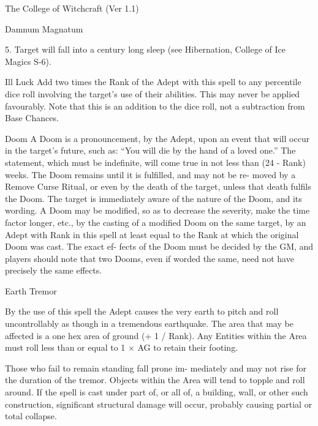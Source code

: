 \begin{Chapter}{The College of Witchcraft (Ver 1.1)}
\begin{spell}[S-10]{Damnum Magnatum }
\begin{effects}
5.  Target  will  fall  into  a  century  long  sleep  (see 
Hibernation, College of Ice Magics S-6). 

Ill Luck Add two times the Rank of the Adept with 
this  spell  to  any  percentile  dice  roll  involving  the 
target’s  use  of  their  abilities.  This  may  never  be 
applied favourably. Note that this is an addition to 
the dice roll, not a subtraction from Base Chances. 

Doom A Doom is a pronouncement, by the Adept, 
upon an event that will occur in the target’s future, 
such as: “You will die by the hand of a loved one.” 
The statement, which must be indefinite, will come 
true in not less than (24 - Rank) weeks. The Doom 
remains  until  it  is  fulfilled,  and  may  not  be  re-
moved  by  a  Remove  Curse  Ritual,  or  even  by  the 
death  of  the  target,  unless  that  death  fulfils  the 
Doom.  The  target  is  immediately  aware  of  the 
nature of the Doom, and its wording. A Doom may 
be  modified,  so  as  to  decrease  the  severity,  make 
the  time  factor  longer,  etc.,  by  the  casting  of  a 
modified  Doom  on  the  same  target,  by  an  Adept 
with Rank in this spell at least equal to the Rank at 
which  the  original  Doom  was  cast.  The  exact  ef-
fects of the Doom must be decided by the GM, and 
players  should  note  that  two  Dooms,  even  if 
worded the same, need not have precisely the same 
effects. 

\end{effects}
\end{spell}

\begin{spell}[S-11]{Earth Tremor }

\begin{effects}
 By  the  use  of  this  spell  the  Adept  causes 
the  very  earth  to  pitch  and  roll  uncontrollably  as 
though  in  a  tremendous  earthquake.  The  area  that 
may be affected is a one hex area of ground (+ 1 / 
Rank). Any Entities within the Area  must roll less 
than or equal to 1 × AG to retain their footing. 

Those  who  fail  to  remain  standing  fall  prone  im-
mediately  and may  not  rise  for  the  duration  of the 
tremor. Objects within the Area will tend to topple 
and roll around. If the spell is cast under part of, or 
all of, a building, wall,  or other such construction, 
significant  structural  damage  will  occur,  probably 
causing partial or total collapse. 


\end{effects}
\end{spell}
\end{Chapter}

